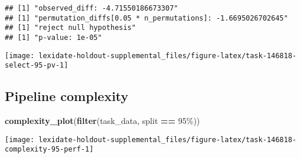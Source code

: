 \documentclass[
]{book}
\newenvironment{Shaded}{\begin{snugshade}}{\end{snugshade}}
\newcommand{\AttributeTok}[1]{\textcolor[rgb]{0.13,0.29,0.53}{#1}}
\newcommand{\DecValTok}[1]{\textcolor[rgb]{0.00,0.00,0.81}{#1}}
\newcommand{\FunctionTok}[1]{\textcolor[rgb]{0.13,0.29,0.53}{\textbf{#1}}}
\newcommand{\NormalTok}[1]{#1}
\newcommand{\OtherTok}[1]{\textcolor[rgb]{0.56,0.35,0.01}{#1}}
\newcommand{\SpecialCharTok}[1]{\textcolor[rgb]{0.81,0.36,0.00}{\textbf{#1}}}
\newcommand{\StringTok}[1]{\textcolor[rgb]{0.31,0.60,0.02}{#1}}
\begin{document}
\begin{Shaded}
\end{Shaded}

\begin{verbatim}
## [1] "observed_diff: -4.71550186673307"
## [1] "permutation_diffs[0.05 * n_permutations]: -1.6695026702645"
## [1] "reject null hypothesis"
## [1] "p-value: 1e-05"
\end{verbatim}

\texttt{[image: lexidate-holdout-supplemental\_files/figure-latex/task-146818-select-95-pv-1]}

\hypertarget{pipeline-complexity-4}{%
\subsection{Pipeline complexity}\label{pipeline-complexity-4}}

\begin{Shaded}
\begin{Highlighting}[]
\FunctionTok{complexity\_plot}\NormalTok{(}\FunctionTok{filter}\NormalTok{(task\_data, split }\SpecialCharTok{==} \StringTok{\textquotesingle{}95\%\textquotesingle{}}\NormalTok{))}
\end{Highlighting}
\end{Shaded}

\texttt{[image: lexidate-holdout-supplemental\_files/figure-latex/task-146818-complexity-95-perf-1]}
\end{document}
